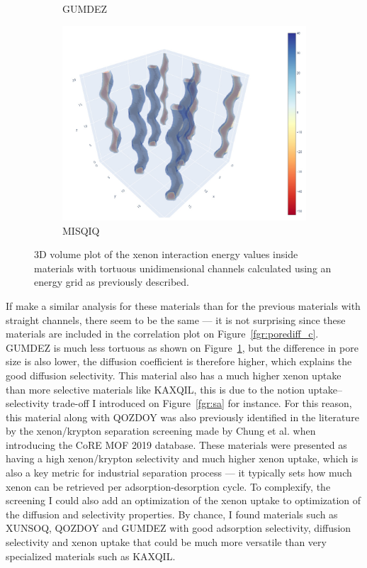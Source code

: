 \documentclass[main]{subfiles}
\begin{document}
\begin{figure}[ht]
\begin{subfigure}[b]{0.3\textwidth}
      \caption{GUMDEZ~\cite{Yin_2014}}\label{fgr:zigzag_b}
  \end{subfigure}
  \hfill
  \begin{subfigure}[b]{0.3\textwidth}
      \centering
      \includegraphics[width=\textwidth]{figures/5-diffusion/viz/MISQIQ.jpg}
      \caption{MISQIQ~\cite{Tong_2013}}\label{fgr:zigzag_c}
  \end{subfigure}
     \caption{ 3D volume plot of the xenon interaction energy values inside materials with tortuous unidimensional channels calculated using an energy grid as previously described.}\label{fgr:zigzag}
\end{figure}

If make a similar analysis for these materials than for the previous materials with straight channels, there seem to be the same --- it is not surprising since these materials are included in the correlation plot on Figure~\ref{fgr:porediff_c}. GUMDEZ is much less tortuous as shown on Figure~\ref{fgr:zigzag_b}, but the difference in pore size is also lower, the diffusion coefficient is therefore higher, which explains the good diffusion selectivity. This material also has a much higher xenon uptake than more selective materials like KAXQIL, this is due to the notion uptake--selectivity trade-off I introduced on Figure~\ref{fgr:sa} for instance. For this reason, this material along with QOZDOY was also previously identified in the literature by the xenon/krypton separation screening made by Chung et al.\autocite{Chung_2019} when introducing the CoRE MOF 2019 database. These materials were presented as having a high xenon/krypton selectivity and much higher xenon uptake, which is also a key metric for industrial separation process --- it typically sets how much xenon can be retrieved per adsorption-desorption cycle. To complexify, the screening I could also add an optimization of the xenon uptake to optimization of the diffusion and selectivity properties. By chance, I found materials such as XUNSOQ, QOZDOY and GUMDEZ with good adsorption selectivity, diffusion selectivity and xenon uptake that could be much more versatile than very specialized materials such as KAXQIL. 
\end{document}
